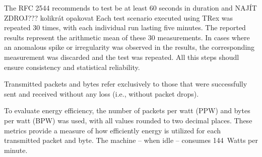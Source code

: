 The RFC 2544 recommends to test be at least 60 seconds in duration\cite{rfc2544} and NAJÍT ZDROJ??? kolikrát opakovat
Each test scenario executed using TRex was repeated 30 times, with each individual run lasting five minutes. 
The reported results represent the arithmetic mean of these 30 measurements. 
In cases where an anomalous spike or irregularity was observed in the results, the corresponding measurement was discarded and the test was repeated.  
All this steps shoudl ensure consistency and statistical reliability.

Transmitted packets and bytes refer exclusively to those that were successfully sent and received without any loss (i.e., without packet drops).

To evaluate energy efficiency, the number of packets per watt (PPW) and bytes per watt (BPW) was used, with all values rounded to two decimal places. 
These metrics provide a measure of how efficiently energy is utilized for each transmitted packet and byte. 
The machine -- when idle -- consumes 144~Watts per minute.
